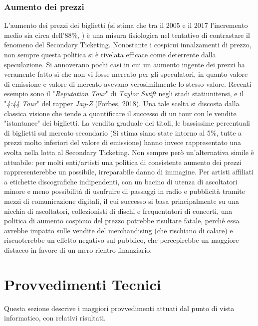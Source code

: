 \subsubsection{Aumento dei prezzi}
L'aumento dei prezzi dei biglietti (si stima che tra il 2005 e il 2017 l'incremento medio sia circa dell'88\%, \cite{tompkins2018ticket}) è una misura fisiologica nel tentativo di contrastare il fenomeno del Secondary Ticketing. Nonostante i cospicui innalzamenti di prezzo, non sempre questa politica si è rivelata efficace come deterrente dalla speculazione. 
Si annoverano pochi casi in cui un aumento ingente dei prezzi ha veramente fatto sì che non vi fosse mercato per gli speculatori, in quanto valore di emissione e valore di mercato avevano verosimilmente lo stesso valore. Recenti esempio sono il "\textit{Reputation Tour}" di \textit{Taylor Swift} negli stadi statiunitensi, e il "\textit{4:44 Tour}" del rapper 	\textit{Jay-Z} (Forbes, 2018). Una tale scelta si discosta dalla classica visione che tende a quantificare il successo di un tour con le vendite "istantanee" dei biglietti. 
La vendita graduale dei titoli, le bassissime percentuali di biglietti sul mercato secondario (Si stima siano state intorno al 5\%, tutte a prezzi molto inferiori del valore di emissione) hanno invece rappresentato una svolta nella lotta al Secondary Ticketing. 
Non sempre però un'alternativa simile è attuabile: per molti enti/artisti una politica di consistente aumento dei prezzi rappresenterebbe un possibile, irreparabile danno di immagine. 
Per artisti affiliati a etichette discografiche indipendenti, con un bacino di utenza di ascoltatori minore e meno possibilità di usufruire di passaggi in radio e pubblicità tramite mezzi di comunicazione digitali, il cui successo si basa principalmente su una nicchia di ascoltatori, collezionisti di dischi e frequentatori di concerti, una politica di aumento cospicuo del prezzo potrebbe risultare fatale, perché essa avrebbe impatto sulle vendite del merchandising (che rischiano di calare) e riscuoterebbe un effetto negativo sul pubblico, che percepirebbe un maggiore distacco in favore di un mero rientro finanziario. 


\section{Provvedimenti Tecnici}
Questa sezione descrive i maggiori provvedimenti attuati dal punto di vista informatico, con relativi risultati.
